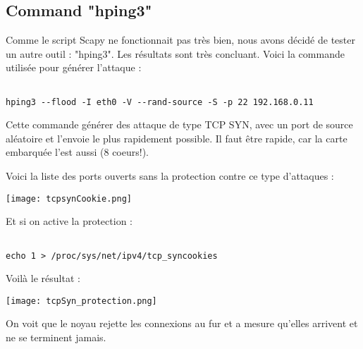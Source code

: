 \subsection{Command "hping3"}
Comme le script Scapy ne fonctionnait pas très bien, nous avons décidé de tester un autre outil : "hping3". Les résultats sont très concluant. Voici la commande utilisée pour générer l'attaque :
\begin{lstlisting}[frame=single,style=Console]  % Start your code-block

hping3 --flood -I eth0 -V --rand-source -S -p 22 192.168.0.11
\end{lstlisting}

Cette commande générer des attaque de type TCP SYN, avec un port de source aléatoire et l'envoie le plus rapidement possible. Il faut être rapide, car la carte embarquée l'est aussi (8 coeurs!).

Voici la liste des ports ouverts sans la protection contre ce type d'attaques :
\begin{center} 
\hspace{15cm}
\texttt{[image: tcpsynCookie.png]}
\end{center}
\vspace{0.5cm}

\pagebreak
Et si on active la protection : 
\begin{lstlisting}[frame=single,style=Console]  % Start your code-block

echo 1 > /proc/sys/net/ipv4/tcp_syncookies
\end{lstlisting}

Voilà le résultat :
\begin{center} 
\hspace{15cm}
\texttt{[image: tcpSyn\_protection.png]}
\end{center}
\vspace{0.5cm}

On voit que le noyau rejette les connexions au fur et a mesure qu'elles arrivent et ne se terminent jamais.


